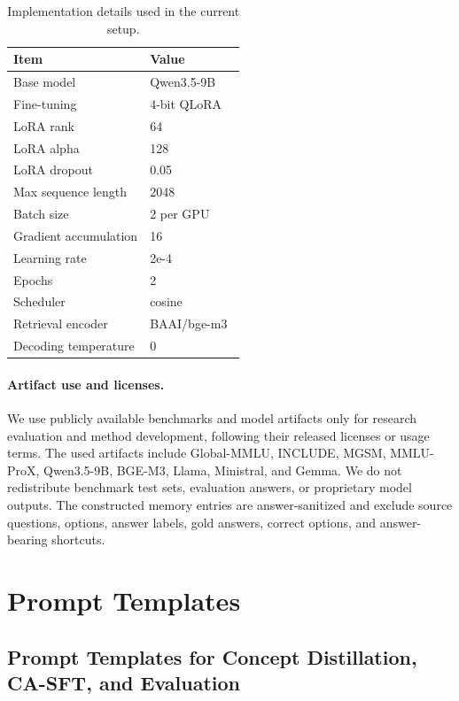 \documentclass[11pt]{article}
\newcommand{\FloatBarrier}{}
\begin{document}
\begin{table}[!htbp]
\centering
\scriptsize
\setlength{\tabcolsep}{6pt}
\begin{tabular}{l l}
\hline
Item & Value \\
\hline
Base model & Qwen3.5-9B~\citep{qwen35} \\
Fine-tuning & 4-bit QLoRA~\citep{dettmers2023qlora} \\
LoRA rank & 64 \\
LoRA alpha & 128 \\
LoRA dropout & 0.05 \\
Max sequence length & 2048 \\
Batch size & 2 per GPU \\
Gradient accumulation & 16 \\
Learning rate & 2e-4 \\
Epochs & 2 \\
Scheduler & cosine \\
Retrieval encoder & BAAI/bge-m3~\citep{chen2024bge} \\
Decoding temperature & 0 \\
\hline
\end{tabular}
\caption{Implementation details used in the current setup.}
\label{tab:implementation_details}
\end{table}
\FloatBarrier

\paragraph{Artifact use and licenses.}
We use publicly available benchmarks and model artifacts only for research evaluation and method development, following their released licenses or usage terms. The used artifacts include Global-MMLU, INCLUDE, MGSM, MMLU-ProX, Qwen3.5-9B, BGE-M3, Llama, Ministral, and Gemma. We do not redistribute benchmark test sets, evaluation answers, or proprietary model outputs. The constructed memory entries are answer-sanitized and exclude source questions, options, answer labels, gold answers, correct options, and answer-bearing shortcuts.

\section{Prompt Templates}
\label{sec:app_prompts}
\subsection{Prompt Templates for Concept Distillation, CA-SFT, and Evaluation}
\end{document}
